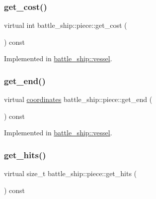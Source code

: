 \mbox{\label{classbattle__ship_1_1piece_a9193782bce8a697bd5d3cb391d5f1623}} 
\subsubsection{\texorpdfstring{get\+\_\+cost()}{get\_cost()}}
{\footnotesize\ttfamily virtual int battle\+\_\+ship\+::piece\+::get\+\_\+cost (\begin{DoxyParamCaption}{ }\end{DoxyParamCaption}) const\hspace{0.3cm}{\ttfamily [pure virtual]}}



Implemented in \hyperlink{classbattle__ship_1_1vessel_aadca1fe2ac265ed9f22e68490b6b22eb}{battle\+\_\+ship\+::vessel}.

\mbox{\label{classbattle__ship_1_1piece_a4f7ac17a3ba66f104d2c5110e0fe51d4}} 
\subsubsection{\texorpdfstring{get\+\_\+end()}{get\_end()}}
{\footnotesize\ttfamily virtual \hyperlink{structbattle__ship_1_1coordinates}{coordinates} battle\+\_\+ship\+::piece\+::get\+\_\+end (\begin{DoxyParamCaption}{ }\end{DoxyParamCaption}) const\hspace{0.3cm}{\ttfamily [pure virtual]}}



Implemented in \hyperlink{classbattle__ship_1_1vessel_ab24ee1fe21632b510833c8369ef3560a}{battle\+\_\+ship\+::vessel}.

\mbox{\label{classbattle__ship_1_1piece_a51123474a964caa97a4c29b053ac0fad}} 
\subsubsection{\texorpdfstring{get\+\_\+hits()}{get\_hits()}}
{\footnotesize\ttfamily virtual size\+\_\+t battle\+\_\+ship\+::piece\+::get\+\_\+hits (\begin{DoxyParamCaption}{ }\end{DoxyParamCaption}) const\hspace{0.3cm}{\ttfamily [pure virtual]}}



